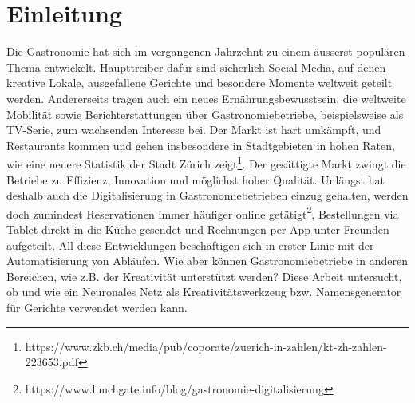 \chapter{Einleitung}
\label{ch:introduction}

Die Gastronomie hat sich im vergangenen Jahrzehnt zu einem äusserst populären Thema entwickelt.
Haupttreiber dafür sind sicherlich Social Media, auf denen kreative Lokale, ausgefallene Gerichte und besondere
Momente weltweit geteilt werden.
Andererseits tragen auch ein neues Ernährungsbewusstsein, die weltweite Mobilität sowie Berichterstattungen über Gastronomiebetriebe, beispielsweise als TV-Serie, zum wachsenden Interesse bei.
Der Markt ist hart umkämpft, und Restaurants kommen und gehen insbesondere in Stadtgebieten in hohen Raten, wie eine neuere
Statistik der Stadt Zürich zeigt\footnote{https://www.zkb.ch/media/pub/coporate/zuerich-in-zahlen/kt-zh-zahlen-223653.pdf}.
Der gesättigte Markt zwingt die Betriebe zu Effizienz, Innovation und möglichst hoher Qualität.
Unlängst hat deshalb auch die Digitalisierung in Gastronomiebetrieben einzug gehalten, werden doch zumindest Reservationen immer
häufiger online getätigt\footnote{https://www.lunchgate.info/blog/gastronomie-digitalisierung}, Bestellungen via Tablet
direkt in die Küche gesendet und Rechnungen per App unter Freunden aufgeteilt.
All diese Entwicklungen beschäftigen sich in erster Linie mit der Automatisierung von Abläufen.
Wie aber können Gastronomiebetriebe in anderen Bereichen, wie z.B. der Kreativität unterstützt werden?
Diese Arbeit untersucht, ob und wie ein Neuronales Netz als Kreativitätswerkzeug bzw. Namensgenerator für
Gerichte verwendet werden kann.
